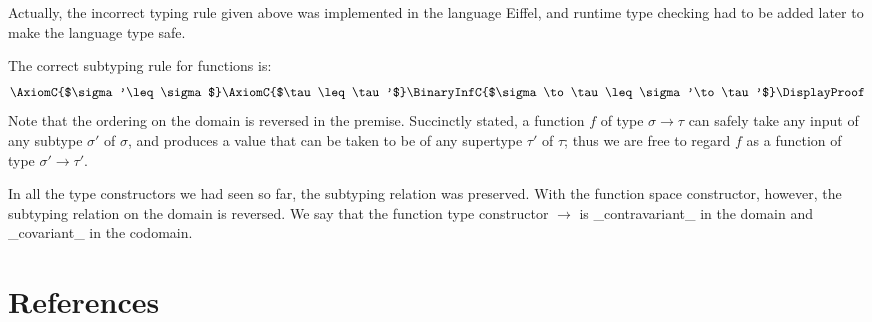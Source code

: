 Actually, the incorrect typing rule given above was implemented in the language Eiffel, and runtime type checking had to be added later to make the language type safe.

The correct subtyping rule for functions is:
\begin{align*}
\AxiomC{$\sigma'\leq \sigma$}
\AxiomC{$\tau\leq\tau'$}
\BinaryInfC{$\sigma\to\tau\leq\sigma'\to\tau'$}
\DisplayProof
\end{align*}
Note that the ordering on the domain is reversed in the premise. Succinctly stated, a function $f$ of type $\sigma\to\tau$ can safely take any input of any subtype $\sigma'$ of $\sigma$, and produces a value that can be taken to be of any supertype $\tau'$ of $\tau$; thus we are free to regard $f$ as a function of type $\sigma'\to\tau'$.

In all the type constructors we had seen so far, the subtyping relation was preserved. With the function space constructor, however, the subtyping relation on the domain is reversed. We say that the function type constructor $\to$ is _contravariant_ in the domain and _covariant_ in the codomain.

\section{References}

